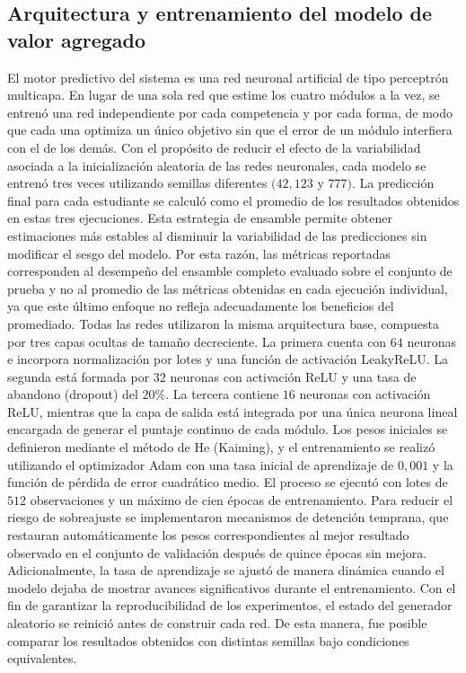 \subsection{Arquitectura y entrenamiento del modelo de valor agregado}
El motor predictivo del sistema es una red neuronal artificial de tipo perceptrón multicapa. En lugar de una sola red que estime los cuatro módulos a la vez, se entrenó una red independiente por cada competencia y por cada forma, de modo que cada una optimiza un único objetivo sin que el error de un módulo interfiera con el de los demás. 
Con el propósito de reducir el efecto de la variabilidad asociada a la inicialización aleatoria de las redes neuronales, cada modelo se entrenó tres veces utilizando semillas diferentes $(42, 123$ y $777)$. La predicción final para cada estudiante se calculó como el promedio de los resultados obtenidos en estas tres ejecuciones. Esta estrategia de ensamble permite obtener estimaciones más estables al disminuir la variabilidad de las predicciones sin modificar el sesgo del modelo. Por esta razón, las métricas reportadas corresponden al desempeño del ensamble completo evaluado sobre el conjunto de prueba y no al promedio de las métricas obtenidas en cada ejecución individual, ya que este último enfoque no refleja adecuadamente los beneficios del promediado. 
Todas las redes utilizaron la misma arquitectura base, compuesta por tres capas ocultas de tamaño decreciente. La primera cuenta con $64$ neuronas e incorpora normalización por lotes y una función de activación LeakyReLU. La segunda está formada por $32$ neuronas con activación ReLU y una tasa de abandono (dropout) del $20\%$. La tercera contiene $16$ neuronas con activación ReLU, mientras que la capa de salida está integrada por una única neurona lineal encargada de generar el puntaje continuo de cada módulo. Los pesos iniciales se definieron mediante el método de He (Kaiming), y el entrenamiento se realizó utilizando el optimizador Adam con una tasa inicial de aprendizaje de $0,001$ y la función de pérdida de error cuadrático medio. El proceso se ejecutó con lotes de $512$ observaciones y un máximo de cien épocas de entrenamiento. Para reducir el riesgo de sobreajuste se implementaron mecanismos de detención temprana, que restauran automáticamente los pesos correspondientes al mejor resultado observado en el conjunto de validación después de quince épocas sin mejora. Adicionalmente, la tasa de aprendizaje se ajustó de manera dinámica cuando el modelo dejaba de mostrar avances significativos durante el entrenamiento. Con el fin de garantizar la reproducibilidad de los experimentos, el estado del generador aleatorio se reinició antes de construir cada red. De esta manera, fue posible comparar los resultados obtenidos con distintas semillas bajo condiciones equivalentes. 
